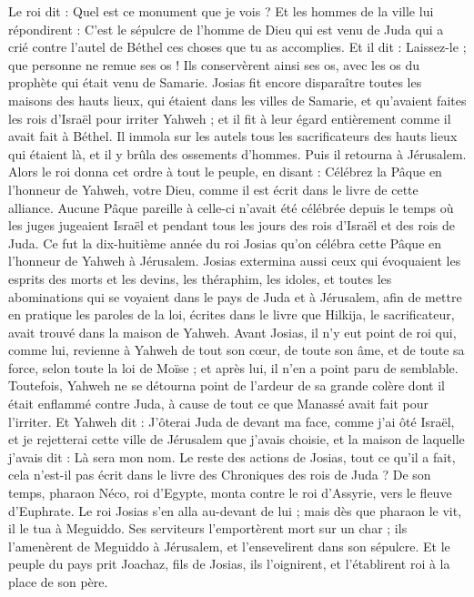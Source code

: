 \begin{multicols}{2}
Le roi dit : Quel est ce monument que je vois ? Et les hommes de la ville lui répondirent : C’est le sépulcre de l’homme de Dieu qui est venu de Juda qui a crié contre l’autel de Béthel ces choses que tu as accomplies\FTNT{}.
Et il dit : Laissez-le ; que personne ne remue ses os ! Ils conservèrent ainsi ses os, avec les os du prophète qui était venu de Samarie.
Josias fit encore disparaître toutes les maisons des hauts lieux, qui étaient dans les villes de Samarie, et qu’avaient faites les rois d’Israël pour irriter Yahweh ; et il fit à leur égard entièrement comme il avait fait à Béthel.
Il immola sur les autels tous les sacrificateurs des hauts lieux qui étaient là, et il y brûla des ossements d’hommes. Puis il retourna à Jérusalem.
Alors le roi donna cet ordre à tout le peuple, en disant : Célébrez la Pâque en l’honneur de Yahweh, votre Dieu, comme il est écrit dans le livre de cette alliance\FTNT{}.
Aucune Pâque pareille à celle-ci n’avait été célébrée depuis le temps où les juges jugeaient Israël et pendant tous les jours des rois d’Israël et des rois de Juda.
Ce fut la dix-huitième année du roi Josias qu’on célébra cette Pâque en l’honneur de Yahweh à Jérusalem.
Josias extermina aussi ceux qui évoquaient les esprits des morts et les devins, les théraphim, les idoles, et toutes les abominations qui se voyaient dans le pays de Juda et à Jérusalem, afin de mettre en pratique les paroles de la loi, écrites dans le livre que Hilkija, le sacrificateur, avait trouvé dans la maison de Yahweh.
Avant Josias, il n’y eut point de roi qui, comme lui, revienne à Yahweh de tout son cœur, de toute son âme, et de toute sa force, selon toute la loi de Moïse ; et après lui, il n’en a point paru de semblable.
Toutefois, Yahweh ne se détourna point de l’ardeur de sa grande colère dont il était enflammé contre Juda, à cause de tout ce que Manassé avait fait pour l’irriter.
Et Yahweh dit : J’ôterai Juda de devant ma face, comme j’ai ôté Israël, et je rejetterai cette ville de Jérusalem que j’avais choisie, et la maison de laquelle j’avais dit : Là sera mon nom.
Le reste des actions de Josias, tout ce qu’il a fait, cela n’est-il pas écrit dans le livre des Chroniques des rois de Juda ?
De son temps, pharaon Néco, roi d’Egypte, monta contre le roi d’Assyrie, vers le fleuve d’Euphrate. Le roi Josias s’en alla au-devant de lui ; mais dès que pharaon le vit, il le tua à Meguiddo.
Ses serviteurs l’emportèrent mort sur un char ; ils l’amenèrent de Meguiddo à Jérusalem, et l’ensevelirent dans son sépulcre. Et le peuple du pays prit Joachaz, fils de Josias, ils l’oignirent, et l’établirent roi à la place de son père.

\end{multicols}
